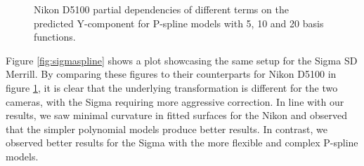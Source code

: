 \begin{figure}
    \centering
    \caption{Nikon D5100 partial dependencies of different terms on the predicted Y-component for P-spline models with 5, 10 and 20 basis functions.}
    \label{fig:nikonspline}
\end{figure}

Figure \ref{fig:sigmaspline} shows a plot showcasing the same setup for the Sigma SD Merrill. By comparing these figures to their counterparts for Nikon D5100 in figure \ref{fig:nikonspline}, it is clear that the underlying transformation is different for the two cameras, with the Sigma requiring more aggressive correction. In line with our results, we saw minimal curvature in fitted surfaces for the Nikon and observed that the simpler polynomial models produce better results. In contrast, we observed better results for the Sigma with the more flexible and complex P-spline models.

